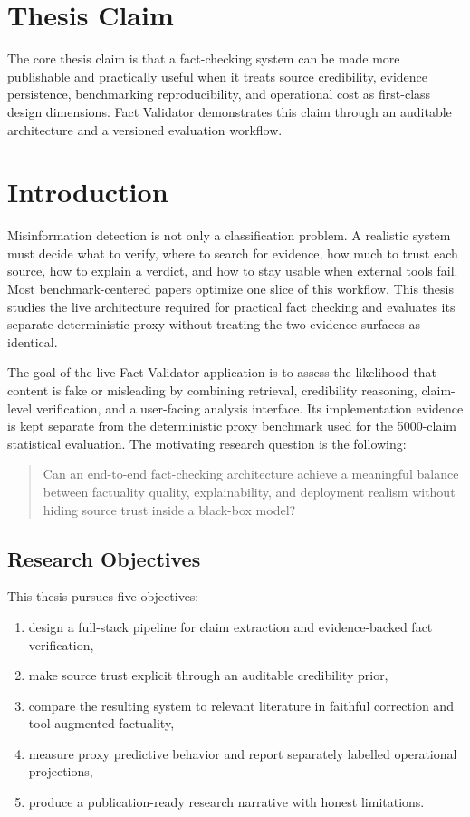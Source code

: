 \documentclass[12pt,a4paper,openright]{report}
\begin{document}
\chapter*{Thesis Claim}
The core thesis claim is that a fact-checking system can be made more publishable and practically useful when it treats source credibility, evidence persistence, benchmarking reproducibility, and operational cost as first-class design dimensions. Fact Validator demonstrates this claim through an auditable architecture and a versioned evaluation workflow.

\tableofcontents
\clearpage


\chapter{Introduction}

Misinformation detection is not only a classification problem. A realistic system must decide what to verify, where to search for evidence, how much to trust each source, how to explain a verdict, and how to stay usable when external tools fail. Most benchmark-centered papers optimize one slice of this workflow. This thesis studies the live architecture required for practical fact checking and evaluates its separate deterministic proxy without treating the two evidence surfaces as identical.

The goal of the live Fact Validator application is to assess the likelihood that content is fake or misleading by combining retrieval, credibility reasoning, claim-level verification, and a user-facing analysis interface. Its implementation evidence is kept separate from the deterministic proxy benchmark used for the 5000-claim statistical evaluation. The motivating research question is the following:

\begin{quote}
Can an end-to-end fact-checking architecture achieve a meaningful balance between factuality quality, explainability, and deployment realism without hiding source trust inside a black-box model?
\end{quote}

\section{Research Objectives}

This thesis pursues five objectives:

\begin{enumerate}
  \item design a full-stack pipeline for claim extraction and evidence-backed fact verification,
  \item make source trust explicit through an auditable credibility prior,
  \item compare the resulting system to relevant literature in faithful correction and tool-augmented factuality,
  \item measure proxy predictive behavior and report separately labelled operational projections,
  \item produce a publication-ready research narrative with honest limitations.
\end{enumerate}
\end{document}
